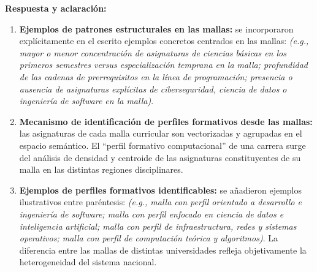 \noindent
{}

\vspace{0.2cm}

\noindent
\textbf{Respuesta y aclaración:}
\begin{enumerate}[leftmargin=*]
	\item \textbf{Ejemplos de patrones estructurales en las mallas:} se incorporaron explícitamente en el escrito ejemplos concretos centrados en las mallas: \textit{(e.g., mayor o menor concentración de asignaturas de ciencias básicas en los primeros semestres versus especialización temprana en la malla; profundidad de las cadenas de prerrequisitos en la línea de programación; presencia o ausencia de asignaturas explícitas de ciberseguridad, ciencia de datos o ingeniería de software en la malla)}.
	\item \textbf{Mecanismo de identificación de perfiles formativos desde las mallas:} las asignaturas de cada malla curricular son vectorizadas y agrupadas en el espacio semántico. El ``perfil formativo computacional'' de una carrera surge del análisis de densidad y centroide de las asignaturas constituyentes de su malla en las distintas regiones disciplinares.
	\item \textbf{Ejemplos de perfiles formativos identificables:} se añadieron ejemplos ilustrativos entre paréntesis: \textit{(e.g., malla con perfil orientado a desarrollo e ingeniería de software; malla con perfil enfocado en ciencia de datos e inteligencia artificial; malla con perfil de infraestructura, redes y sistemas operativos; malla con perfil de computación teórica y algoritmos)}. La diferencia entre las mallas de distintas universidades refleja objetivamente la heterogeneidad del sistema nacional.
\end{enumerate}

\vspace{0.4cm}

\noindent
{}

